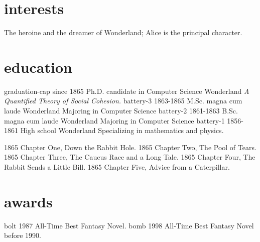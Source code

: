 \documentclass[icon]{twentysecondcv}
\begin{document}
\section{interests}
The heroine and the dreamer of Wonderland;  Alice is the principal character.

\section{education}

\begin{twentyicon}
  \twentyitemicon
    {graduation-cap}
    {since 1865}
    {Ph.D. {\normalfont candidate in Computer Science}}
    {Wonderland}
    {\emph{A Quantified Theory of Social Cohesion.}}
  \twentyitemicon
    {battery-3}
    {1863-1865}
    {M.Sc. magna cum laude}
    {Wonderland}
    {Majoring in Computer Science}
  \twentyitemicon
    {battery-2}
    {1861-1863}
    {B.Sc. magna cum laude}
    {Wonderland}
    {Majoring in Computer Science}
  \twentyitemicon
    {battery-1}
    {1856-1861}
    {High school}
    {Wonderland}
    {Specializing in mathematics and physics.}
\end{twentyicon}

\begin{twentyshort}
  \twentyitemshort
    {1865}
    {Chapter One, Down the Rabbit Hole.}
  \twentyitemshort
    {1865}
    {Chapter Two, The Pool of Tears.}
  \twentyitemshort
    {1865}
    {Chapter Three,  The Caucus Race and a Long Tale.}
  \twentyitemshort
    {1865}
    {Chapter Four,  The Rabbit Sends a Little Bill.}
  \twentyitemshort
    {1865}
    {Chapter Five,  Advice from a Caterpillar.}
\end{twentyshort}

\section{awards}
\begin{twentyshorticon}
  \twentyitemshorticon
    {bolt}
    {1987}
    {All-Time Best Fantasy Novel.}
  \twentyitemshorticon
    {bomb}
    {1998}
    {All-Time Best Fantasy Novel before 1990.}
\end{twentyshorticon}
\end{document}
